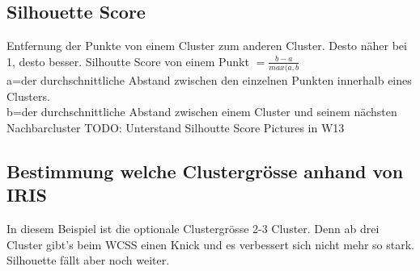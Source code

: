 \subsection{Silhouette Score}
Entfernung der Punkte von einem Cluster zum anderen Cluster. Desto näher bei 1, desto besser.
Silhoutte Score von einem Punkt $= \frac{b-a}{max(a,b}$\\
a=der durchschnittliche Abstand zwischen den einzelnen Punkten innerhalb eines Clusters.\\
b=der durchschnittliche Abstand zwischen einem Cluster und seinem nächsten Nachbarcluster
TODO: Unterstand Silhoutte Score Pictures in W13
\subsection{Bestimmung welche Clustergrösse anhand von IRIS}
In diesem Beispiel ist die optionale Clustergrösse 2-3 Cluster. Denn ab drei Cluster gibt’s beim WCSS einen Knick und es verbessert sich nicht mehr so stark. Silhouette fällt aber noch weiter.
